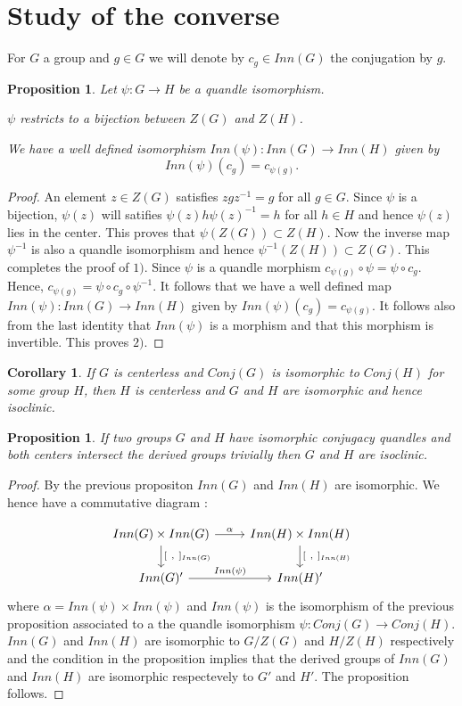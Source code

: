 \documentclass[12pt, reqno]{amsart}
\newtheorem{proposition}[theorem]{Proposition}
\newtheorem{corollary}[theorem]{Corollary}
\begin{document}
 \section{Study of the converse}
For $G$ a group and $g\in G$ we will denote by $c_g\in Inn(G)$ the conjugation by $g$.
\begin{proposition}
Let $\psi : G \to H$ be a quandle isomorphism.
\item[1)] $\psi$ restricts to a bijection between $Z(G) $ and $Z(H)$.
\item[2)] We have a well defined isomorphism $Inn(\psi) : Inn(G) \to Inn(H)$ given by $$Inn(\psi)(c_g)=c_{\psi(g)}.$$
\end{proposition}
\begin{proof}
An element $z\in Z(G)$ satisfies $zgz^{-1}=g$ for all $g\in G$. Since $\psi$ is a bijection, $\psi(z)$ will satifies $\psi(z)h\psi(z)^{-1}=h$ for all $h\in H$ and hence $\psi(z)$ lies in the center. This proves that $\psi (Z(G)) \subset Z(H)$. Now the inverse map $\psi^{-1}$ is also a quandle isomorphism and hence $\psi^{-1}(Z(H))\subset Z(G)$. This completes the proof of $1)$. Since $\psi$ is a quandle morphism $c_{\psi(g)}\circ \psi=\psi \circ c_g$. Hence, $c_{\psi(g)}= \psi \circ c_g \circ \psi^{-1}$. It follows that we have a well defined map $Inn(\psi) : Inn(G) \to Inn(H)$ given by $Inn(\psi)(c_g)=c_{\psi(g)}$. It follows also from the last identity that $Inn(\psi)$ is a morphism and that this morphism is invertible. This proves $2)$.
\end{proof}
\begin{corollary}
If $G$ is centerless and $Conj(G)$ is isomorphic to $Conj(H)$ for some group $H$, then $H$ is centerless and $G$ and $H$ are isomorphic and hence isoclinic.
\end{corollary}
\begin{proposition}
If two groups $G$ and $H$ have isomorphic conjugacy quandles and both centers intersect the derived groups trivially then $G$ and $H$ are isoclinic.
\end{proposition}
\begin{proof}
By the previous propositon $Inn(G)$ and $Inn(H)$ are isomorphic. We hence have a commutative diagram :

$$\begin{tikzcd}
Inn(G)\times Inn(G)\arrow{r}{\alpha}\arrow{d}{[\:\:,\:\:]_{Inn(G)}} &Inn(H)\times Inn(H) \arrow{d}{[\:\:,\:\:]_{Inn(H)}} \\ 
Inn(G)' \arrow{r}{Inn(\psi)}  & Inn(H)' 
\end{tikzcd} $$
where $\alpha= Inn(\psi)\times Inn(\psi)$ and $Inn(\psi)$ is the isomorphism of the previous proposition associated to a the quandle isomorphism $\psi :Conj(G)\to Conj(H)$. $Inn(G)$ and $Inn(H)$ are isomorphic to $G/Z(G)$ and $H/Z(H)$ respectively and the condition in the proposition implies that the derived groups of $Inn(G)$ and $Inn(H)$ are isomorphic respectevely to $G'$ and $H'$. The proposition follows.
\end{proof}
\end{document}
